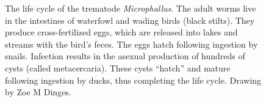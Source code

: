 \documentclass[
  letterpaper,
]{book}
\begin{document}
\begin{figure}


\caption[The life cycle of the trematode
\emph{Microphallus}]{\label{fig-4.1}The life cycle of the trematode
\emph{Microphallus}. The adult worms live in the intestines of waterfowl
and wading birds (black stilts). They produce cross-fertilized eggs,
which are released into lakes and streams with the bird's feces. The
eggs hatch following ingestion by snails. Infection results in the
asexual production of hundreds of cysts (called metacercaria). These
cysts ``hatch'' and mature following ingestion by ducks, thus completing
the life cycle. Drawing by Zoe M Dinges.}

\end{figure}%
\end{document}
